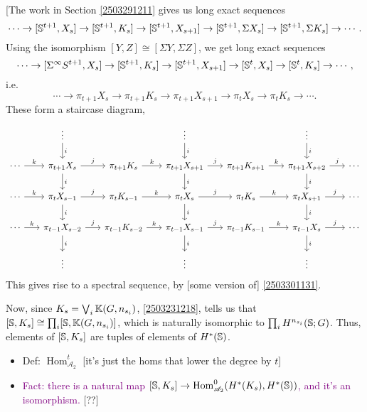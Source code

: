 \documentclass{MetricNotes2023}
\def\bb{\ensuremath\mathbb}
\def\A{\ensuremath{\mathscr{A}_2}}
\DeclareMathOperator{\Hom}{Hom}
\def\textcolour{\textcolor}
\begin{document}
[The work in Section \ref{2503291211} gives us long exact sequences
\[\cdots \to [\bb{S}^{t+1}, X_s] \to [\bb{S}^{t+1}, K_s] \to [\bb{S}^{t+1}, X_{s+1}]\to [\bb{S}^{t+1}, \Sigma X_s]\to [\bb{S}^{t+1}, \Sigma K_s] \to \cdots.\]
Using the isomorphism \([Y,Z]\cong [\Sigma Y, \Sigma Z]\), we get long exact sequences
\[\cdots \to [\Sigma^\infty S^{t+1}, X_s] \to [\bb{S}^{t+1}, K_s] \to [\bb{S}^{t+1}, X_{s+1}]\to [\bb{S}^{t}, X_s]\to [\bb{S}^{t}, K_s] \to \cdots,\]
i.e.
\[\cdots \to \pi_{t+1}X_s \to \pi_{t+1}K_s \to \pi_{t+1}X_{s+1}\to \pi_t X_s\to \pi_t K_s \to \cdots.\]
These form a staircase diagram,
\[\begin{tikzcd}[column sep=4ex]
   &  \vdots \arrow[d, "i"] &  & \vdots \arrow[d, "i"] &  & \vdots \arrow[d, "i"] & \\
 \cdots \arrow[r, "k"] & \pi_{t+1}X_s \arrow[d, "i"] \arrow[r, "j"] & \pi_{t+1}K_s  \arrow[r, "k"] & \pi_{t+1}X_{s+1} \arrow[d, "i"] \arrow[r, "j"] & \pi_{t+1}K_{s+1} \arrow[r, "k"] & \pi_{t+1}X_{s+2} \arrow[d, "i"] \arrow[r, "j"] & \cdots \\
 \cdots \arrow[r, "k"] & \pi_t X_{s-1} \arrow[d, "i"] \arrow[r, "j"] & \pi_t K_{s-1}  \arrow[r, "k"] & \pi_t X_s \arrow[d, "i"] \arrow[r, "j"] & \pi_t K_s \arrow[r, "k"] & \pi_t X_{s+1} \arrow[d, "i"] \arrow[r, "j"] & \cdots \\
 \cdots \arrow[r, "k"] & \pi_{t-1}X_{s-2}  \arrow[d, "i"] \arrow[r, "j"] & \pi_{t-1}K_{s-2}  \arrow[r, "k"] & \pi_{t-1}X_{s-1} \arrow[d, "i"] \arrow[r, "j"] & \pi_{t-1}K_{s-1} \arrow[r, "k"] & \pi_{t-1}X_s \arrow[d, "i"] \arrow[r, "j"] & \cdots \\
 & \vdots &  & \vdots & & \vdots &
\end{tikzcd}\]
This gives rise to a spectral sequence, by [some version of] \ref{2503301131}.

Now, since \(K_s = \bigvee_i \bb{K}(G, n_{s_i})\),  \ref{2503231218}, tells us that \([\bb{S}, K_s]\cong \prod_i[\bb{S}, \bb{K}(G, n_{s_i})]\), which is naturally isomorphic to \(\prod_i H^{n_{s_i}}(\bb{S}; G)\). Thus, elements of \([\bb{S}, K_s]\) are tuples of elements of \(H^*(\bb{S})\).

\begin{itemize}
\item Def: \(\Hom^t_{\A}\) [it's just the homs that lower the degree by \(t\)]

\item \textcolour{purple}{Fact: there is a natural map \([\bb{S}, K_s]\to \Hom^0_{\A}(H^*(K_s), H^*(\bb{S}))\), and it's an isomorphism.} [??]
\end{itemize}
\end{document}

